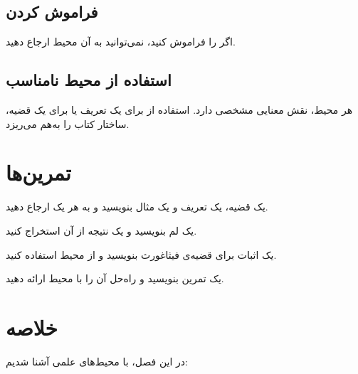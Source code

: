 \subsection{فراموش کردن }
\label{sec:environments-mistake-no-label}

اگر  را فراموش کنید، نمی‌توانید به
آن محیط ارجاع دهید.

\subsection{استفاده از محیط نامناسب}
\label{sec:environments-mistake-wrong-env}

هر محیط، نقش معنایی مشخصی دارد. استفاده از
 برای یک تعریف یا 
برای یک قضیه، ساختار کتاب را به‌هم می‌ریزد.

\section{تمرین‌ها}
\label{sec:environments-exercises}

\begin{exercise}
    یک قضیه، یک تعریف و یک مثال بنویسید و
    به هر یک ارجاع دهید.
    \label{exc:environments-basic}
\end{exercise}

\begin{exercise}
    یک لم بنویسید و یک نتیجه از آن استخراج
    کنید.
    \label{exc:environments-lemma}
\end{exercise}

\begin{exercise}
    یک اثبات برای قضیه‌ی فیثاغورث بنویسید
    و از محیط  استفاده کنید.
    \label{exc:environments-proof}
\end{exercise}

\begin{exercise}
    یک تمرین بنویسید و راه‌حل آن را با محیط
     ارائه دهید.
    \label{exc:environments-solution}
\end{exercise}

\section{خلاصه}
\label{sec:environments-summary}

در این فصل، با محیط‌های علمی 
آشنا شدیم:

